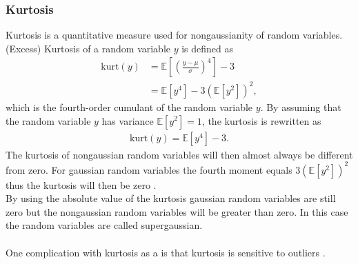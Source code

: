 \subsubsection{Kurtosis}
Kurtosis is a quantitative measure used for nongaussianity of random variables. (Excess) Kurtosis of a random variable $y$ is defined as
\begin{align*}
\text{kurt} (y) &= \mathbb{E} \left[ \left(\frac{y - \mu}{\sigma}\right)^4 \right] - 3 \\
&= \mathbb{E}[y^4] - 3 ( \mathbb{E}[y^2])^2,
\end{align*}
which is the fourth-order cumulant of the random variable $y$. By assuming that the random variable $y$ has variance $\mathbb{E}[y^2] = 1$, the kurtosis is rewritten as
\begin{align*}
\text{kurt} (y) = \mathbb{E}[y^4] - 3.
\end{align*}
The kurtosis of nongaussian random variables will then almost always be different from zero. For gaussian random variables the fourth moment equals $3(\mathbb{E}[y^2])^2$ thus the kurtosis will then be zero \cite[p. 171]{ICA}.
\\
By using the absolute value of the kurtosis gaussian random variables are still zero but the nongaussian random variables will be greater than zero. In this case the random variables are called supergaussian.
\\ \\
One complication with kurtosis as a is that kurtosis is sensitive to outliers \cite[p. 182]{ICA}.
 
